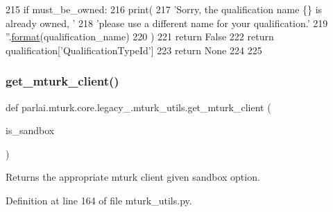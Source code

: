 \begin{DoxyCode}
215             \textcolor{keywordflow}{if} must\_be\_owned:
216                 print(
217                     \textcolor{stringliteral}{'Sorry, the qualification name \{\} is already owned, '}
218                     \textcolor{stringliteral}{'please use a different name for your qualification.'}
219                     \textcolor{stringliteral}{''}.\hyperlink{namespaceparlai_1_1chat__service_1_1services_1_1messenger_1_1shared__utils_a32e2e2022b824fbaf80c747160b52a76}{format}(qualification\_name)
220                 )
221                 \textcolor{keywordflow}{return} \textcolor{keyword}{False}
222             \textcolor{keywordflow}{return} qualification[\textcolor{stringliteral}{'QualificationTypeId'}]
223     \textcolor{keywordflow}{return} \textcolor{keywordtype}{None}
224 
225 
\end{DoxyCode}
\mbox{\label{namespaceparlai_1_1mturk_1_1core_1_1legacy__2018_1_1mturk__utils_a9999d5b551e569fe3ddd368e4e659b65}} 
\subsubsection{\texorpdfstring{get\+\_\+mturk\+\_\+client()}{get\_mturk\_client()}}
{\footnotesize\ttfamily def parlai.\+mturk.\+core.\+legacy\+\_.\+mturk\+\_\+utils.\+get\+\_\+mturk\+\_\+client (\begin{DoxyParamCaption}\item[{}]{is\+\_\+sandbox }\end{DoxyParamCaption})}

\begin{DoxyVerb}Returns the appropriate mturk client given sandbox option.
\end{DoxyVerb}
 

Definition at line 164 of file mturk\+\_\+utils.\+py.


